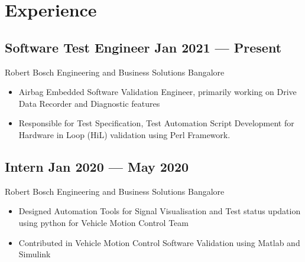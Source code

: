 \documentclass[a4,10pt]{article}
\newcommand{\subtext}[1]{
#1\par\vspace{-0.2cm}}
\newenvironment{zitemize}{
\begin{itemize}\itemsep0pt \parskip0pt \parsep1pt}
{\end{itemize}\vspace{-0.5cm}}
\begin{document}
\section{Experience}

        

\subsection*{Software Test Engineer \hfill Jan 2021 --- Present} 
\subtext{Robert Bosch Engineering and Business Solutions \hfill Bangalore} 
    \begin{zitemize}
        \item Airbag Embedded Software Validation Engineer, primarily working on Drive Data Recorder and Diagnostic features 
        \item Responsible for Test Specification, Test Automation Script Development for Hardware in Loop (HiL) validation using Perl Framework.
    \end{zitemize}


\subsection*{Intern \hfill Jan 2020 --- May 2020} 
\subtext{Robert Bosch Engineering and Business Solutions \hfill Bangalore} 
    \begin{zitemize}
        \item Designed Automation Tools for Signal Visualisation and Test status updation using python for Vehicle Motion Control Team 
        \item Contributed in Vehicle Motion Control Software Validation using Matlab and Simulink
    \end{zitemize}
    
\end{document}
